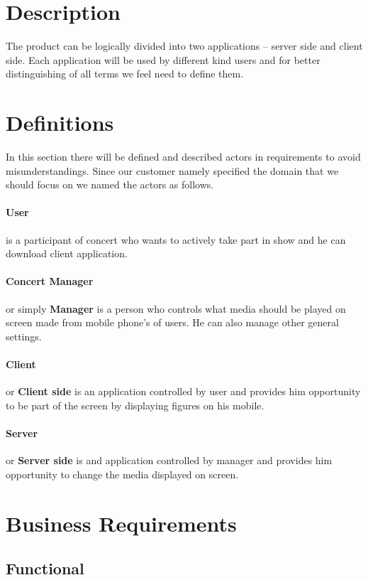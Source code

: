 \section{Description}
The product can be logically divided into two applications -- server side  and client side.
Each application will be used by different kind users and for better distinguishing of all terms we feel need to define them.

\section{Definitions}
In this section there will be defined and described actors in requirements to avoid misunderstandings. Since our customer namely specified the domain that we should focus on we named the actors as follows.

\paragraph{User} is a participant of concert who wants to actively take part in show and he can download client application.

\paragraph{Concert Manager} or simply \textbf{Manager} is a person who controls what media should be played on screen made from mobile phone's of users. 
He can also manage other general settings.

\paragraph{Client} or \textbf{Client side} is an application controlled by user and provides him opportunity to be part of the screen by displaying figures on his mobile.

\paragraph{Server} or \textbf{Server side} is and application controlled by manager and provides him opportunity to change the media displayed on screen.

\section{Business Requirements}
\subsection{Functional}

